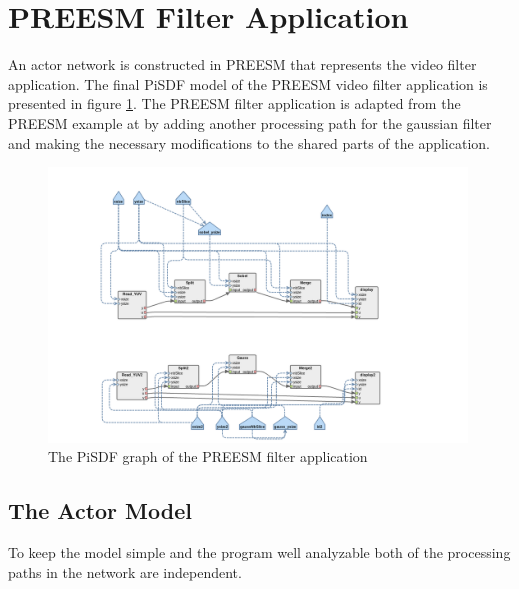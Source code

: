 \section{PREESM Filter Application}
\label{sec:preesmapp}
An actor network is constructed in PREESM that represents the video filter
application. The final PiSDF model of the PREESM video filter application is
presented in figure \ref{fig:preesm_actors}. The PREESM filter application is
adapted from the PREESM example at \cite{preesmtut} by adding another
processing path for the gaussian filter and making the necessary modifications
to the shared parts of the application.

\begin{figure}[h!]
    \begin{center}
        \includegraphics[width=0.99\textwidth]{images/preesm_diagram.png}
        \caption{The PiSDF graph of the PREESM filter application}
        \label{fig:preesm_actors}
    \end{center}
\end{figure}

\subsection{The Actor Model}
\label{subsec:actors}
To keep the model simple and the program well analyzable both of the processing
paths in the network are independent. 

